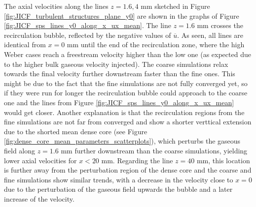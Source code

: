 The axial velocities along the lines $z = 1.6, 4$ mm sketched in Figure \ref{fig:JICF_turbulent_structures_plane_y0} are shown in the graphs of Figure \ref{fig:JICF_sps_lines_y0_along_x_ux_mean}. The line $z = 1.6$ mm crosses the recirculation bubble, reflected by the negative values of $\overline{u}$. As seen, all lines are identical from $x = 0$ mm until the end of the recirculation zone, where the high Weber cases reach a freestream velocity higher than the low one (as expected due to the higher bulk gaseous velocity injected). The coarse simulations relax towards the final velocity further downstream faster than the fine ones. This might be due to the fact that the fine simulations are not fully converged yet, so if they were run for longer the recirculation bubble could approach to the coarse one and the lines from Figure \ref{fig:JICF_sps_lines_y0_along_x_ux_mean} would get closer. Another explanation is that the recirculation regions from the fine simulations are not far from converged and show a shorter verttical extension due to the shorted mean dense core (see Figure \ref{fig:dense_core_mean_parameters_scatterplots}),  which perturbs the gaseous field along $z = 1.6$ mm further downstream than the coarse simulations, yielding lower axial velocities for $x < 20$ mm. Regarding the line $z = 40$ mm, this location is further away from the perturbation region of the dense core and the coarse and fine simulations show similar trends, with a decrease in the velocity close to $x = 0$ due to the perturbation of the gaseous field upwards the bubble and a later increase of the velocity.

